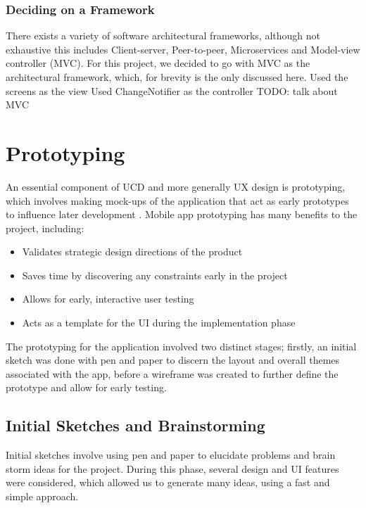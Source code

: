 \documentclass[12pt]{article}
\begin{document}
	 	
	


	\subsubsection{Deciding on a Framework}
	There exists a variety of software architectural frameworks, although not exhaustive this includes Client-server, Peer-to-peer, Microservices and Model-view controller (MVC). For this project, we decided to go with MVC as the architectural framework, which, for brevity is the only discussed here.
	Used the screens as the view
	Used ChangeNotifier as the controller
	TODO: talk about MVC
	
	\section{Prototyping}
	An essential component of UCD and more generally UX design is prototyping, which involves making mock-ups of the application that act as early prototypes to influence later development \cite{arnowitzChapter15Wireframe2007}. Mobile app prototyping has many benefits to the project, including:
	\begin{itemize}
		\item Validates strategic design directions of the product
		\item Saves time by discovering any constraints early in the project
		\item Allows for early, interactive user testing
		\item Acts as a template for the UI during the implementation phase
	\end{itemize}
	 
	
	The prototyping for the application involved two distinct stages; firstly, an initial sketch was done with pen and paper to discern the layout and overall themes associated with the app, before a wireframe was created to further define the prototype and allow for early testing.
	
	\subsection{Initial Sketches and Brainstorming}
	Initial sketches involve using pen and paper to elucidate problems and brain storm ideas for the project. During this phase, several design and UI features were considered, which allowed us to generate many ideas, using a fast and simple approach.
	
\end{document}

